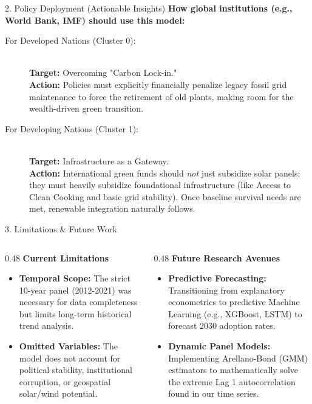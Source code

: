 \documentclass[aspectratio=169]{beamer}
\begin{document}
\begin{frame}{2. Policy Deployment (Actionable Insights)}
  \textbf{How global institutions (e.g., World Bank, IMF) should use this model:}
  \vspace{0.3cm}
  
  \begin{description}
      \item[For Developed Nations (Cluster 0):] \hfill \\
      \textbf{Target:} Overcoming "Carbon Lock-in." \\
      \textbf{Action:} Policies must explicitly financially penalize legacy fossil grid maintenance to force the retirement of old plants, making room for the wealth-driven green transition.

      \vspace{0.2cm}
      \item[For Developing Nations (Cluster 1):] \hfill \\
      \textbf{Target:} Infrastructure as a Gateway. \\
      \textbf{Action:} International green funds should \textit{not} just subsidize solar panels; they must heavily subsidize foundational infrastructure (like Access to Clean Cooking and basic grid stability). Once baseline survival needs are met, renewable integration naturally follows.
  \end{description}
\end{frame}

\begin{frame}{3. Limitations \& Future Work}
  \begin{columns}[T]
    \begin{column}{0.48\textwidth}
      \textbf{Current Limitations}
      \begin{itemize}
          \small
          \item \textbf{Temporal Scope:} The strict 10-year panel (2012-2021) was necessary for data completeness but limits long-term historical trend analysis.
          \item \textbf{Omitted Variables:} The model does not account for political stability, institutional corruption, or geospatial solar/wind potential.
      \end{itemize}
    \end{column}
    
    \begin{column}{0.48\textwidth}
      \textbf{Future Research Avenues}
      \begin{itemize}
          \small
          \item \textbf{Predictive Forecasting:} Transitioning from explanatory econometrics to predictive Machine Learning (e.g., XGBoost, LSTM) to forecast 2030 adoption rates.
          \item \textbf{Dynamic Panel Models:} Implementing Arellano-Bond (GMM) estimators to mathematically solve the extreme Lag 1 autocorrelation found in our time series.
      \end{itemize}
    \end{column}
  \end{columns}
\end{frame}
\end{document}
